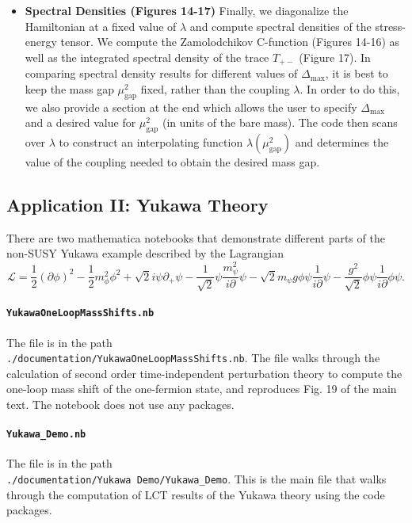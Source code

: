 \documentclass[12pt]{article}
\newcommand{\Lcal}{{\mathcal L}}
\newcommand\De\Delta
\newcommand{\p}{\partial}
\newcommand{\gap}{\textrm{gap}}
\newcommand{\Dmax}{\De_{\max}}
\begin{document}
\begin{itemize}
\begin{itemize}
\item \textbf{Spectral Densities (Figures 14-17)} \newline
Finally, we diagonalize the Hamiltonian at a fixed value of $\lambda$ and compute spectral densities of the stress-energy tensor. We compute the Zamolodchikov C-function (Figures 14-16) as well as the integrated spectral density of the trace $T_{+-}$ (Figure 17). In comparing spectral density results for different values of $\Dmax$, it is best to keep the mass gap $\mu_{\gap}^2$ fixed, rather than the coupling $\lambda$. In order to do this, we also provide a section at the end which allows the user to specify $\Dmax$ and a desired value for $\mu_{\gap}^2$ (in units of the bare mass). The code then scans over $\lambda$ to construct an interpolating function $\lambda(\mu_{\gap}^2)$ and determines the value of the coupling needed to obtain the desired mass gap.
\end{itemize}
\end{itemize}

\subsection{Application II: Yukawa Theory}
There are two mathematica notebooks that demonstrate different parts of the non-SUSY Yukawa example described by the Lagrangian
\begin{equation}
\Lcal = \frac{1}{2} (\p \phi)^2 - \frac{1}{2}m_\phi^2 \phi^2 + \sqrt{2} i\psi\p_+\psi - \frac{1}{\sqrt{2}} \psi\frac{m_\psi^2 }{i\p} \psi - \sqrt{2}m_\psi g \phi \psi\frac{1}{i\p} \psi - \frac{g^2}{\sqrt{2}} \phi  \psi\frac{1}{i\p} \phi \psi  .
\label{eq:YukawaLCLag2}
\end{equation}

\paragraph{{\tt YukawaOneLoopMassShifts.nb}}
The file is in the path \\{\tt ./documentation/YukawaOneLoopMassShifts.nb}. The file walks through the calculation of second order time-independent perturbation theory to compute the one-loop mass shift of the one-fermion state, and reproduces Fig. 19 of the main text. The notebook does not use any packages.

\paragraph{{\tt Yukawa\_Demo.nb}}
The file is in the path \\{\tt ./documentation/Yukawa Demo/Yukawa\_Demo}. This is the main file that walks through the computation of LCT results of the Yukawa theory using the code packages. 
\end{document}
